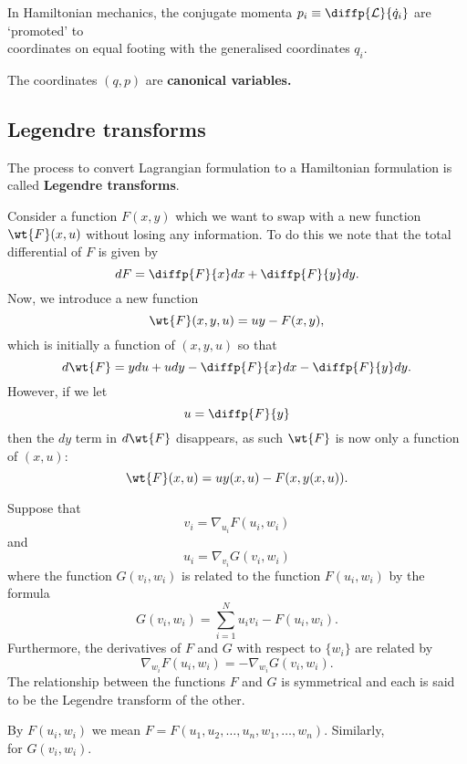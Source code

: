 \documentclass[12pt, a4paper]{article}
\begin{document}
In Hamiltonian mechanics, the conjugate momenta \(p_i \equiv \diffp{\mathcal{L}}{{\dot{q}_i}}\) are `promoted' to \\ coordinates on equal footing with the generalised coordinates \(q_i\). 

\begin{definition}
    The coordinates \((q,p)\) are \textbf{canonical variables.}
\end{definition}

\subsection{Legendre transforms}

\begin{definition}
    The process to convert Lagrangian formulation to a Hamiltonian formulation is called \textbf{Legendre transforms}.
\end{definition}

Consider a function \(F(x,y)\) which we want to swap with a new function \(\wt{F}(x,u)\) without losing any information. To do this we note that the total differential of \(F\) is given by
\[dF = \diffp{F}{x}dx + \diffp{F}{y}dy.\]
Now, we introduce a new function 
\[\wt{F}(x,y,u) = uy-F(x,y),\]
which is initially a function of \((x,y,u)\) so that 
\[d\wt{F} = y du +u dy -\diffp{F}{x} dx - \diffp{F}{y} dy.\]
However, if we let 
\[u = \diffp{F}{y}\]
then the \(dy\) term in \(d\wt{F}\) disappears, as such \(\wt{F}\) is now only a function of \((x,u)\):
\[\wt{F}(x,u) = uy(x,u)- F(x,y(x,u)).\]

\begin{mdthm}
    Suppose that 
    \[v_i = \nabla_{u_i} F(u_i,w_i)\]
    and 
    \[u_i = \nabla_{v_i} G(v_i,w_i)\]
    where the function \(G(v_i,w_i)\) is related to the function \(F(u_i,w_i)\) by the formula 
    \[G(v_i,w_i) = \sum_{i=1}^{N} u_i v_i -F(u_i,w_i).\]
    Furthermore, the derivatives of \(F\) and \(G\) with respect to \(\{w_i\}\) are related by 
    \[\nabla_{w_i} F(u_i,w_i) = - \nabla_{w_i} G(v_i,w_i).\]
    The relationship between the functions \(F\) and \(G\) is symmetrical and each is said to be the Legendre transform of the other.
\end{mdthm}

\begin{mdnote}
    By \(F(u_i,w_i)\) we mean \(F = F(u_1,u_2, \ldots, u_n, w_1, \ldots, w_n)\). Similarly,\\ for \(G(v_i,w_i)\).
\end{mdnote}
\end{document}
